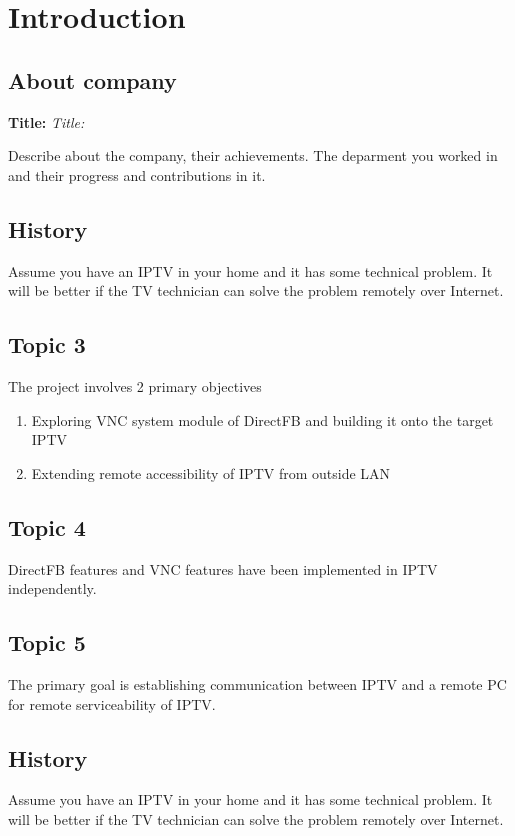 \chapter{Introduction}

\section{About company}
\textbf{Title:} 
\textit{Title:}

Describe about the company, their achievements. The deparment you worked in and their progress and contributions in it.

\section{History}
Assume you have an IPTV in your home and it has some technical problem. It will be better if the TV technician can solve the problem remotely over Internet. 

\section{Topic 3}
The project involves 2 primary objectives
\begin{enumerate}
\item Exploring VNC system module of DirectFB and building it onto the target IPTV
\item Extending remote accessibility of IPTV from outside LAN
\end{enumerate}

\section{Topic 4}
DirectFB features and VNC features have been implemented in IPTV independently.

\section{Topic 5}
The primary goal is establishing communication between IPTV and a remote PC for remote serviceability of IPTV.


\section{History}
Assume you have an IPTV in your home and it has some technical problem. It will be better if the TV technician can solve the problem remotely over Internet. 

